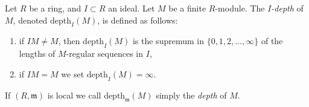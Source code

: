 \begin{definition}
\label{definition-depth}
Let $R$ be a ring, and $I \subset R$ an ideal. Let $M$ be a finite $R$-module.
The {\it $I$-depth} of $M$, denoted $\text{depth}_I(M)$, is defined as follows:
\begin{enumerate}
\item if $IM \not = M$, then $\text{depth}_I(M)$ is the supremum in
$\{0, 1, 2, \ldots, \infty\}$ of the lengths of $M$-regular sequences in $I$,
\item if $IM = M$ we set $\text{depth}_I(M) = \infty$.
\end{enumerate}
If $(R, \mathfrak m)$ is local we call $\text{depth}_{\mathfrak m}(M)$ simply
the {\it depth} of $M$.
\end{definition}